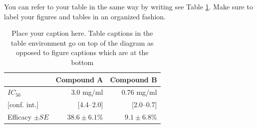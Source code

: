 You can refer to your table in the same way by writing see Table \ref{table:1.1}. Make sure to label your figures and tables in an organized fashion.

\begin{table}[H] %
    \centering
    \caption{Place your caption here. Table captions in the table environment go on top of the diagram as opposed to figure captions which are at the bottom}
    \label{table:1.1}
    \begin{tabular}{@{}lrr@{}}
    \toprule
    & Compound A & Compound B \\
    \midrule
    $IC_{50}$ & 3.0 mg/ml & 0.76 mg/ml \\
    {[conf. int.]} & [4.4–2.0] & [2.0–0.7] \\
    Efficacy $\pm SE$ & $38.6 \pm 6.1\%$ & $9.1 \pm 6.8\%$ \\ 
    \bottomrule
\end{tabular}
\end{table}


